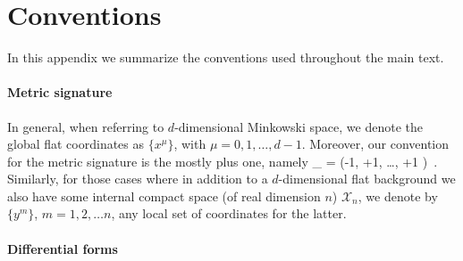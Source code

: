 \chapter{Conventions}
\label{ap:conventions}

In this appendix we summarize the conventions used throughout the main text.

\subsubsection*{Metric signature}

In general, when referring to $d$-dimensional Minkowski space, we denote the global flat coordinates as $\{x^{\mu}\}$, with $\mu=0,1,\ldots,d-1$. Moreover, our convention for the metric signature is the mostly plus one, namely
%
\beq\label{eq:Minksignature}
 \eta_{\mu \nu} =  \left(-1, +1, \ldots, +1 \right)\, .
\eeq
%
Similarly, for those cases where in addition to a $d$-dimensional flat background we also have some internal compact space (of real dimension $n$) $\mathcal{X}_n$, we denote by $\{y^m\}$, $m=1, 2, \ldots n$, any local set of coordinates for the latter.

\subsubsection*{Differential forms}

